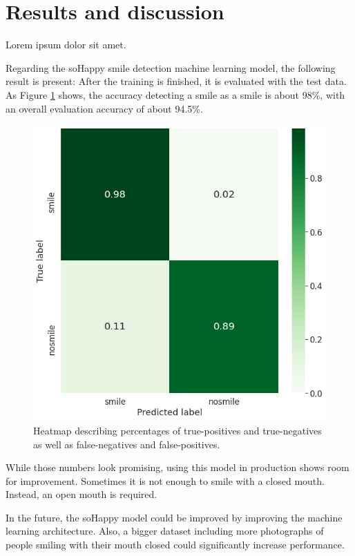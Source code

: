 \section{Results and discussion} \label{sec:results_and_discussion}
Lorem ipsum dolor sit amet.


Regarding the soHappy smile detection machine learning model, the following
result is present: After the training is finished, it is evaluated with the
test data. As Figure \ref{fig:training_result} shows, the accuracy detecting a
smile as a smile is about 98\%, with an overall evaluation accuracy of about 
94.5\%.

\begin{figure}
  \includegraphics[width=\linewidth]{figures/training_result.png}
  \caption{Heatmap describing percentages of true-positives and true-negatives as well as false-negatives and false-positives.}
  \label{fig:training_result}
\end{figure}

While those numbers look promising, using this model in production shows
room for improvement. Sometimes it is not enough to smile with a closed
mouth. Instead, an open mouth is required.

In the future, the soHappy model could be improved by improving the machine 
learning architecture. Also, a bigger dataset including more photographs of
people smiling with their mouth closed could significantly increase 
performance.